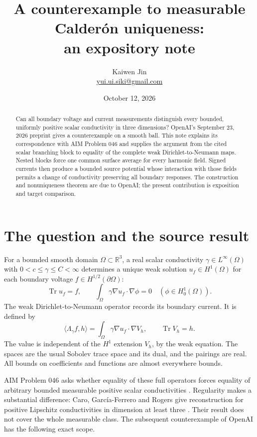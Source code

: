 \documentclass[10pt]{article}
\title{A counterexample to measurable Calder\'on uniqueness:\\ an expository note}
\author{Kaiwen Jin\\\small\href{mailto:yui.ui.siki@gmail.com}{yui.ui.siki@gmail.com}}
\date{October 12, 2026}
\newcommand{\R}{\mathbb R}
\newcommand{\Tr}{\operatorname{Tr}}
\begin{document}
\maketitle
\begin{abstract}
Can all boundary voltage and current measurements distinguish every bounded, uniformly positive scalar conductivity in three dimensions? OpenAI's September 23, 2026 preprint gives a counterexample on a smooth ball. This note explains its correspondence with AIM Problem 046 and supplies the argument from the cited scalar branching block to equality of the complete weak Dirichlet-to-Neumann maps. Nested blocks force one common surface average for every harmonic field. Signed currents then produce a bounded source potential whose interaction with those fields permits a change of conductivity preserving all boundary responses. The construction and nonuniqueness theorem are due to OpenAI; the present contribution is exposition and target comparison.
\end{abstract}

\section{The question and the source result}
For a bounded smooth domain $\Omega\subset\R^3$, a real scalar conductivity $\gamma\in L^\infty(\Omega)$ with $0<c\leq\gamma\leq C<\infty$ determines a unique weak solution $u_f\in H^1(\Omega)$ for each boundary voltage $f\in H^{1/2}(\partial\Omega)$:
\[
\Tr u_f=f,\qquad \int_\Omega\gamma\nabla u_f\cdot\nabla\phi=0\quad(\phi\in H^1_0(\Omega)).
\]
The weak Dirichlet-to-Neumann operator records its boundary current. It is defined by
\begin{equation}\label{eq:dn}
\langle\Lambda_\gamma f,h\rangle=\int_\Omega\gamma\nabla u_f\cdot\nabla V_h,
\qquad \Tr V_h=h.
\end{equation}
The value is independent of the $H^1$ extension $V_h$, by the weak equation. The spaces are the usual Sobolev trace space and its dual, and the pairings are real. All bounds on coefficients and functions are almost everywhere bounds.

AIM Problem 046 asks whether equality of these full operators forces equality of arbitrary bounded measurable positive scalar conductivities \cite{aim}. Regularity makes a substantial difference: Caro, Garc\'ia-Ferrero and Rogers give reconstruction for positive Lipschitz conductivities in dimension at least three \cite[Introduction]{cgr}. Their result does not cover the whole measurable class. The subsequent counterexample of OpenAI has the following exact scope.
\end{document}
